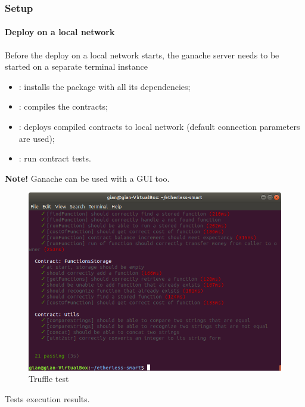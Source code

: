 \subsubsection{Setup}
\paragraph{Deploy on a local network}
 Before the deploy on a local network starts, the ganache server needs to be started on a separate terminal instance 
\begin{itemize}
    \item {} : installs the package with all its dependencies;    
    \item {}: compiles the contracts;
    \item {}: deploys compiled contracts to local network (default connection parameters are used);
    \item {}: run contract tests.
\end{itemize}
\textbf{Note!} Ganache can be used with a GUI too.
\begin{figure}[h]
	\centering
	\includegraphics[width=\textwidth]{res/img/truffleTest.png}
	\caption{Truffle test}
\end{figure}
Tests execution results.
